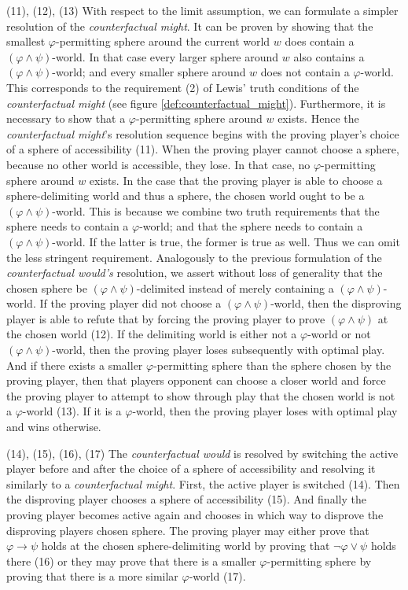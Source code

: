\documentclass[a4paper,american,10pt]{paper}
\theoremstyle{definition}\newtheorem{lemma}[thm]{Lemma}
\theoremstyle{definition}\newtheorem{proposition}[thm]{Proposition}
\theoremstyle{definition}\newtheorem{corollary}[thm]{Corollary}
\theoremstyle{definition}\newtheorem{definition}{Definition}
\begin{document}
\indent (11), (12), (13) With respect to the limit assumption, we can formulate a simpler resolution of the \textit{counterfactual might}. It can be proven by showing that the smallest $\varphi$-permitting sphere around the current world $w$ does contain a $(\varphi\wedge\psi )$-world. In that case every larger sphere around $w$ also contains a $(\varphi\wedge\psi )$-world; and every smaller sphere around $w$ does not contain a $\varphi$-world. This corresponds to the requirement (2) of Lewis' truth conditions of the \textit{counterfactual might} (see figure \ref{def:counterfactual_might}). Furthermore, it is necessary to show that a $\varphi$-permitting sphere around $w$ exists. Hence the \textit{counterfactual might}'s resolution sequence begins with the proving player's choice of a sphere of accessibility (11). When the proving player cannot choose a sphere, because no other world is accessible, they lose. In that case, no $\varphi$-permitting sphere around $w$ exists. In the case that the proving player is able to choose a sphere-delimiting world and thus a sphere, the chosen world ought to be a $(\varphi\wedge\psi )$-world. This is because we combine two truth requirements that the sphere needs to contain a $\varphi$-world; and that the sphere needs to contain a $(\varphi\wedge\psi )$-world. If the latter is true, the former is true as well. Thus we can omit the less stringent requirement. Analogously to the previous formulation of the \textit{counterfactual would's} resolution, we assert without loss of generality that the chosen sphere be $(\varphi\wedge\psi )$-delimited instead of merely containing a $(\varphi\wedge\psi )$-world. If the proving player did not choose a $(\varphi\wedge\psi )$-world, then the disproving player is able to refute that by forcing the proving player to prove $(\varphi\wedge\psi )$ at the chosen world (12). If the delimiting world is either not a $\varphi$-world or not $(\varphi\wedge\psi )$-world, then the proving player loses subsequently with optimal play. And if there exists a smaller $\varphi$-permitting sphere than the sphere chosen by the proving player, then that players opponent can choose a closer world and force the proving player to attempt to show through play that the chosen world is not a $\varphi$-world (13). If it is a $\varphi$-world, then the proving player loses with optimal play and wins otherwise.

(14), (15), (16), (17) The \textit{counterfactual would} is resolved by switching the active player before and after the choice of a sphere of accessibility and resolving it similarly to a \textit{counterfactual might}. First, the active player is switched (14). Then the disproving player chooses a sphere of accessibility (15). And finally the proving player becomes active again and chooses in which way to disprove the disproving players chosen sphere. The proving player may either prove that $\varphi\rightarrow\psi$ holds at the chosen sphere-delimiting world by proving that $\neg\varphi\vee\psi$ holds there (16) or they may prove that there is a smaller $\varphi$-permitting sphere by proving that there is a more similar $\varphi$-world (17).
\end{document}
